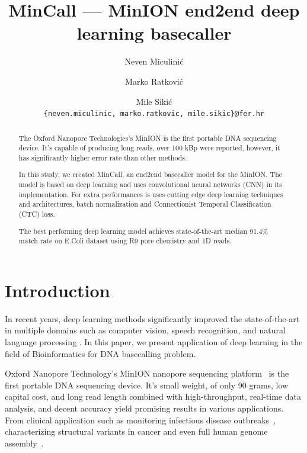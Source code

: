 \documentclass[runningheads,a4paper]{llncs}
\begin{document}
\frontmatter

\title{MinCall --- MinION end2end deep learning basecaller}
\author{Neven Miculinić \and Marko Ratković \and Mile Sikić\\
\texttt{\{neven.miculinic, marko.ratkovic, mile.sikic\}@fer.hr}}

\maketitle

\begin{abstract}
    The Oxford Nanopore Technologies's MinION is the first portable DNA sequencing device. It's capable of producing long reads, over 100 kBp were reported, however, it has significantly higher error rate than other methods.

    In this study, we created MinCall, an end2end basecaller model for the MinION. The model is based on deep learning and uses convolutional neural networks (CNN) in its implementation. For extra performances is uses cutting edge deep learning techniques and architectures, batch normalization and Connectionist Temporal Classification (CTC) loss.

    The best performing deep learning model achieves state-of-the-art median 91.4\% match rate on E.Coli dataset using R9 pore chemistry and 1D reads.
\end{abstract}

\section{Introduction}
In recent years, deep learning methods significantly improved the state-of-the-art in multiple domains such as computer vision, speech recognition, and natural language processing \cite{LeCun:1998:CNI:303568.303704}\cite{NIPS2012_4824}.
In this paper, we present application of deep learning in the field of  Bioinformatics for DNA basecalling problem.

Oxford Nanopore Technology's MinION nanopore sequencing platform~\cite{mikheyev2014first} is the first portable DNA sequencing device. It's small weight, of only 90 grams, low capital cost, and long read length combined with high-throughput, real-time data analysis, and decent accuracy yield promising results in various applications. From clinical application such as monitoring infectious disease outbreaks~\cite{judge2015early}\cite{quick2016real}, characterizing structural variants in cancer\cite{norris2016nanopore} and even full human genome assembly~\cite{jain2017nanopore}.
\end{document}
